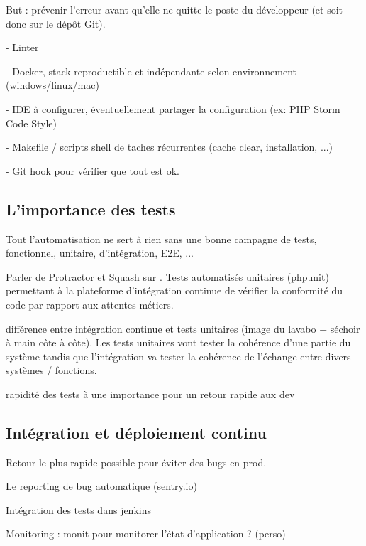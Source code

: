 But : prévenir l'erreur avant qu'elle ne quitte le poste du développeur (et soit donc sur le dépôt Git).

-  Linter

-  Docker, stack reproductible et indépendante selon environnement (windows/linux/mac) 

- IDE à configurer, éventuellement partager la configuration (ex: PHP Storm Code Style)

-  Makefile / scripts shell de taches récurrentes (cache clear, installation, ...)

- Git hook pour vérifier que tout est ok.


\subsection{L'importance des tests}


Tout l'automatisation ne sert à rien sans une bonne campagne de tests, fonctionnel, unitaire, d'intégration, E2E, ...

Parler de Protractor et Squash sur \bv. Tests automatisés unitaires (phpunit) permettant à la plateforme d'intégration continue de vérifier la conformité du code par rapport aux attentes métiers.

différence entre intégration continue et tests unitaires (image du lavabo + séchoir à main côte à côte). Les tests unitaires vont tester la cohérence d'une partie du système tandis que l'intégration va tester la cohérence de l'échange entre divers systèmes / fonctions.

rapidité des tests à une importance pour un retour rapide aux dev

\subsection{Intégration et déploiement continu}


Retour le plus rapide possible pour éviter des bugs en prod. 

Le reporting de bug automatique (sentry.io)

Intégration des tests dans jenkins

Monitoring : monit pour monitorer l'état d'application ? (perso)


